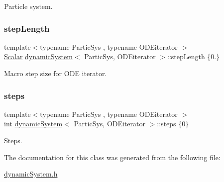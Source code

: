 Particle system. 

\mbox{\label{classdynamic_system_a3f0e5b7ef17b728c723c67aefa9dbada}} 
\subsubsection{\texorpdfstring{step\+Length}{stepLength}}
{\footnotesize\ttfamily template$<$typename Partic\+Sys , typename O\+D\+Eiterator $>$ \\
\mbox{\hyperlink{classdynamic_system_a6eb7b06a4ee5721a1ee0855a854c3431}{Scalar}} \mbox{\hyperlink{classdynamic_system}{dynamic\+System}}$<$ Partic\+Sys, O\+D\+Eiterator $>$\+::step\+Length \{0.\}}



Macro step size for O\+DE iterator. 

\mbox{\label{classdynamic_system_ae9821e179896e6cddbbcc4e706552c57}} 
\subsubsection{\texorpdfstring{steps}{steps}}
{\footnotesize\ttfamily template$<$typename Partic\+Sys , typename O\+D\+Eiterator $>$ \\
int \mbox{\hyperlink{classdynamic_system}{dynamic\+System}}$<$ Partic\+Sys, O\+D\+Eiterator $>$\+::steps \{0\}}



Steps. 



The documentation for this class was generated from the following file\+:\begin{DoxyCompactItemize}
\item 
\mbox{\hyperlink{dynamic_system_8h}{dynamic\+System.\+h}}\end{DoxyCompactItemize}
